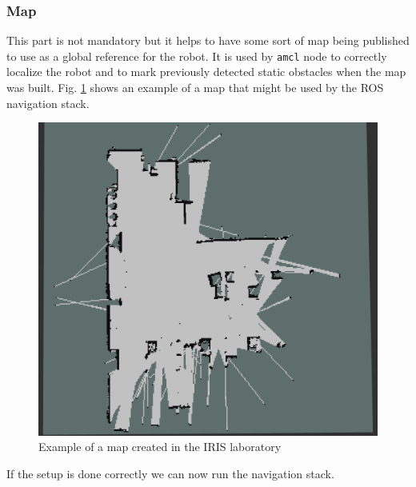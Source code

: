 \subsubsection{Map}
This part is not mandatory but it helps to have some sort of map being published to use as a global reference for the robot. It is used by \texttt{amcl} node to correctly localize the robot and to mark previously detected static obstacles when the map was built. Fig. \ref{fig:map} shows an example of a map that might be used by the ROS navigation stack.
\begin{figure}[!htb]
    \centering
    \includegraphics[scale=0.4]{imgs/chapter3/map2.png}
    \caption{Example of a map created in the IRIS laboratory}
    \label{fig:map}
\end{figure}
If the setup is done correctly we can now run the navigation stack.
